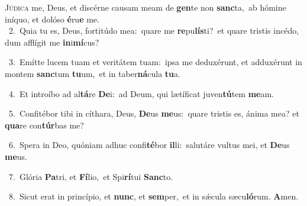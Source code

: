 \lettrine{\initial\textcolor{\initialcolor}{J}}{údica} me, Deus, et discérne causam meam de \textbf{gen}\-te non \textbf{sanc}\-ta,~\star ab hómine iníquo, et dolóso \textbf{é}\-ru\textbf{e} me.\\
{\numbfont\textcolor{\numbcolor}{~2.}}~Quia tu es, Deus, fortitúdo mea:~\dagger quare me \textbf{re}\-pu\-\textbf{lís}\-ti?~\star et quare tristis incédo, dum afflígit me \textbf{in}\-i\-\textbf{mí}\-cus?\par
{\numbfont\textcolor{\numbcolor}{~3.}}~Emítte lucem tuam et veritátem tuam:~\dagger ipsa me deduxérunt, et adduxérunt in montem \textbf{sanc}\-tum \textbf{tu}\-um,~\star et in taber\-\textbf{ná}\-cula \textbf{tu}\-a.\par
{\numbfont\textcolor{\numbcolor}{~4.}}~Et introíbo ad al\-\textbf{tá}\-re \textbf{De}\-i:~\star ad Deum, qui lætíficat juven\-\textbf{tú}\-tem \textbf{me}\-am.\par
{\numbfont\textcolor{\numbcolor}{~5.}}~Confitébor tibi in cíthara, Deus, \textbf{De}\-us \textbf{me}\-us:~\star quare tristis es, ánima mea? et \textbf{qua}\-re con\-\textbf{túr}\-bas me?\par
{\numbfont\textcolor{\numbcolor}{~6.}}~Spera in Deo, quóniam adhuc confi\-\textbf{té}\-bor \textbf{il}\-li:~\star salutáre vultus mei, et \textbf{De}\-us \textbf{me}\-us.\par
{\numbfont\textcolor{\numbcolor}{~7.}}~Glória \textbf{Pa}\-tri, et \textbf{Fí}\-lio,~\star et Spi\-\textbf{rí}\-tui \textbf{Sanc}\-to.\par
{\numbfont\textcolor{\numbcolor}{~8.}}~Sicut erat in princípio, et \textbf{nunc}\-, et \textbf{sem}\-per,~\star et in sǽcula sæcu\-\textbf{ló}\-rum. \textbf{A}\-men.\par
